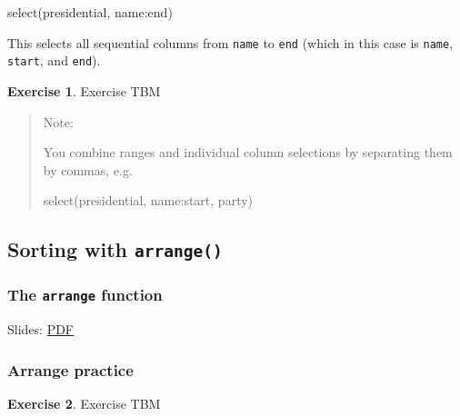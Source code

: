 \documentclass[
]{article}
\newenvironment{Shaded}{\begin{snugshade}}{\end{snugshade}}
\newcommand{\FunctionTok}[1]{\textcolor[rgb]{0.00,0.00,0.00}{#1}}
\newcommand{\NormalTok}[1]{#1}
\newcommand{\SpecialCharTok}[1]{\textcolor[rgb]{0.00,0.00,0.00}{#1}}
\theoremstyle{definition}
\theoremstyle{definition}
\theoremstyle{definition}
\newtheorem{exercise}{Exercise}[section]
\theoremstyle{definition}
\theoremstyle{remark}
\begin{document}
\begin{Shaded}
\begin{Highlighting}[]
\FunctionTok{select}\NormalTok{(presidential, name}\SpecialCharTok{:}\NormalTok{end)}
\end{Highlighting}
\end{Shaded}

This selects all sequential columns from \texttt{name} to \texttt{end} (which in this case is \texttt{name}, \texttt{start}, and \texttt{end}).

\begin{exercise}
Exercise TBM
\end{exercise}

\begin{quote}
Note:

You combine ranges and individual column selections by separating them by commas, e.g.

\begin{Shaded}
\begin{Highlighting}[]
\FunctionTok{select}\NormalTok{(presidential, name}\SpecialCharTok{:}\NormalTok{start, party)}
\end{Highlighting}
\end{Shaded}
\end{quote}

\hypertarget{sorting-with-arrange}{%
\subsection{\texorpdfstring{Sorting with \texttt{arrange()}}{Sorting with arrange()}}\label{sorting-with-arrange}}

\hypertarget{the-arrange-function}{%
\subsubsection{\texorpdfstring{The \texttt{arrange} function}{The arrange function}}\label{the-arrange-function}}

Slides: \href{https://drive.google.com/file/d/1yrnIiFINXI1nA8IFRnPhbLZVdU5MVcXn}{PDF}

\hypertarget{arrange-practice}{%
\subsubsection{Arrange practice}\label{arrange-practice}}

\begin{exercise}
Exercise TBM
\end{exercise}
\end{document}
